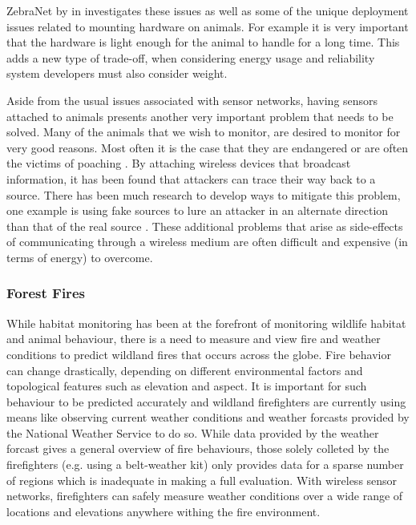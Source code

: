 ZebraNet by \citeauthor{Juang:2002:ECW:635508.605408} in \cite{Juang:2002:ECW:635508.605408} investigates these issues as well as some of the unique deployment issues related to mounting hardware on animals. For example it is very important that the hardware is light enough for the animal to handle for a long time. This adds a new type of trade-off, when considering energy usage and reliability system developers must also consider weight.

Aside from the usual issues associated with sensor networks, having sensors attached to animals presents another very important problem that needs to be solved. Many of the animals that we wish to monitor, are desired to monitor for very good reasons. Most often it is the case that they are endangered or are often the victims of poaching \cite{6115161,Biagioni02theapplication}. By attaching wireless devices that broadcast information, it has been found that attackers can trace their way back to a source. There has been much research to develop ways to mitigate this problem, one example is using fake sources to lure an attacker in an alternate direction than that of the real source \cite{Ozturk:2004:SPE:1029102.1029117,Kamat.1437121,6296046}. These additional problems that arise as side-effects of communicating through a wireless medium are often difficult and expensive (in terms of energy) to overcome.

\subsubsection*{Forest Fires}
\cite{libeliumForestFires}
\cite{FireWxNet}
\cite{4428702}

While habitat monitoring has been at the forefront of monitoring wildlife habitat and animal behaviour, there is a need to measure and view fire and weather conditions to predict wildland fires that occurs across the globe. Fire behavior can change drastically, depending on different environmental factors and topological features such as elevation and aspect. It is important for such behaviour to be predicted accurately and wildland firefighters are currently using means like observing current weather conditions and weather forcasts provided by the  National Weather Service to do so. While data provided by the weather forcast gives a general overview of fire behaviours, those solely colleted by the firefighters (e.g. using a belt-weather kit) only provides data for a sparse number of regions which is inadequate in making a full evaluation. With wireless sensor networks, firefighters can safely measure weather conditions over a wide range of locations and elevations anywhere withing the fire environment.

